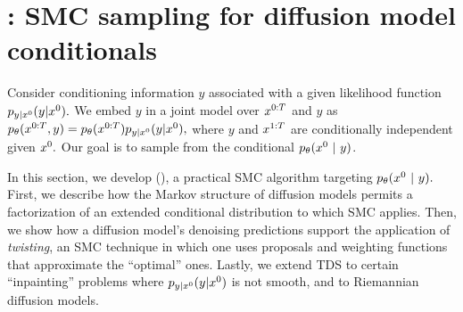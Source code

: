 \section{\methodname{}: SMC sampling for diffusion model conditionals }\label{sec:method}





Consider conditioning information $y$ associated with a given likelihood function $p_{y|x^{0}}({y}|{x^{0}}).$
We embed $y$ in a joint model over $x^{0:T}$ and $y$ as
$p_{\theta}(x^{0:T},y) = p_{\theta}(x^{0:T}) p_{y|x^{0}}({y}|{x^{0}}),$ 
where $y$ and $x^{1:T}$ are conditionally independent given $x^{0}.$
Our goal is to sample from the conditional $p_{\theta}(x^{0}~\vert~ y)$.%

In this section, we develop \methodname{} (\methodshort{}), a practical SMC algorithm targeting $p_{\theta}(x^{0} ~\vert~ y).$ 
First, we describe how the Markov structure of diffusion models permits a factorization of an extended conditional distribution to which SMC applies.
Then, we show how a diffusion model's denoising predictions support the application of \emph{twisting}, an SMC technique in which one uses proposals and weighting functions that approximate the ``optimal'' ones.
Lastly, we extend TDS to certain ``inpainting'' problems where $p_{y|x^{0}}({y}|{x^{0}})$ is not smooth,
and to Riemannian diffusion models.


